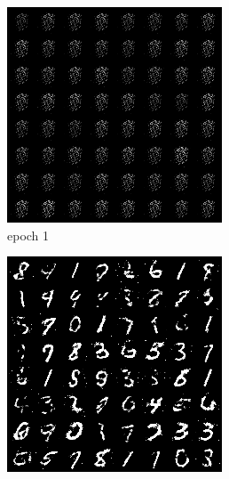 \documentclass[a4paper]{article}
\theoremstyle{definition}
\newenvironment{soln}{
	\leavevmode\color{blue}\ignorespaces
}{}
\begin{document}
\begin{enumerate} [label=(\alph*)]
\begin{soln}
			\begin{figure}[H]
				\centering
				\begin{subfigure}[b]{0.3\textwidth}
					\centering
					\includegraphics[width=\textwidth]{outputs/q3/gen_img1.png}
					\caption{epoch 1}
				\end{subfigure}
				\hfill
				\begin{subfigure}[b]{0.3\textwidth}
					\centering
					\includegraphics[width=\textwidth]{outputs/q3/gen_img50.png}

\end{subfigure}
\end{figure}
\end{soln}
\end{enumerate}
\end{document}
